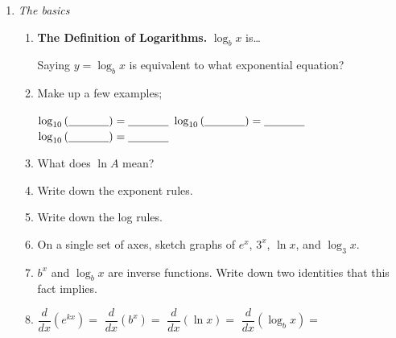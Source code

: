\documentclass{article}
\theoremstyle{theorem}
\begin{document}

\begin{enumerate}

\item \emph{The basics}

  \begin{enumerate}
  \item
    \textbf{The Definition of Logarithms.} $\log_b x$ is\ldots

    \pspace{0.35in}

    Saying $y = \log_b x$ is equivalent to what exponential equation?  

    \pspace{0.35in}

  \item Make up a few examples;

    $\log_{10} \left( \fitb{0.5in}{} \right)= \fitb{0.5in}{}$ \qquad $\displaystyle \log_{10} \left( \fitb{0.5in}{} \right) = \fitb{0.5in}{}$ \qquad $\displaystyle \log_{10} \left( \fitb{0.5in}{} \right) = \fitb{0.5in}{}$

    \pspace{0.35in}

  \item
    \begin{problem}[0.35in]
      What does $\ln A$ mean?
    \end{problem}

  \item
    \begin{problem}[\vfill]
      Write down the exponent rules.
    \end{problem}

  \item
    \begin{problem}[\nstretch{0.75}]
      Write down the log rules.
    \end{problem}

  \item
    \begin{problem}[\vfill]
      On a single set of axes, sketch graphs of $e^x$, $3^x$, $\ln x$, and $\log_3 x$.
    \end{problem}

  \item
    \begin{problem}[\stretch{0.5}]
      $b^x$ and $\log_b x$ are inverse functions. Write down two identities that this fact implies.
    \end{problem}

  \item $\dfrac{d}{dx} (e^{kx}) = $ \hfill $\dfrac{d}{dx} (b^x) = $ \hfill $\dfrac{d}{dx} (\ln x) = $ \hfill $\dfrac{d}{dx} (\log_b x) = $ \hfill \ 


\end{enumerate}
\end{enumerate}
\end{document}
